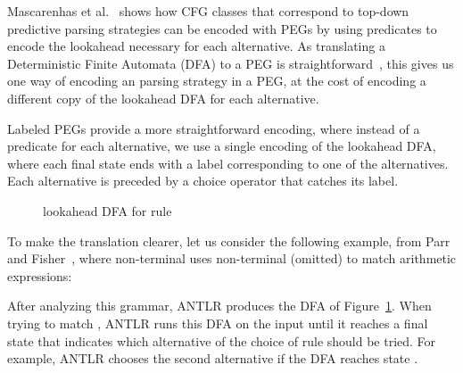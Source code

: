 \documentclass[3p,12pt,singlecolumn]{elsarticle}
\begin{document}
Mascarenhas et al.~\cite{mascarenhas2014} shows how
CFG classes that correspond to top-down predictive parsing
strategies can be encoded with PEGs by using predicates to
encode the lookahead necessary for each alternative.
As translating a Deterministic Finite Automata (DFA) to a
PEG is straightforward~\cite{ierusalimschy2009lpeg,mascarenhas2014},
this gives us one way of encoding an  parsing strategy in
a PEG, at the cost of encoding a different copy of the
lookahead DFA for each alternative.

Labeled PEGs provide a more straightforward encoding,
where instead of a predicate for each alternative, 
we use a single encoding of the lookahead DFA, where each
final state ends with a label corresponding to one
of the alternatives. Each alternative is preceded by
a choice operator that catches its label.

\begin{figure}[t]
\begin{center}
\end{center}
\caption{ lookahead DFA for rule }
\label{fig:antlrdfa}
\end{figure}

To make the translation clearer, let us consider the following
example, from Parr and Fisher~\cite{parr2011llstar},
where non-terminal  uses non-terminal  (omitted) to match
arithmetic expressions:


After analyzing this grammar, ANTLR produces the DFA
of Figure~\ref{fig:antlrdfa}. When trying to match ,
ANTLR runs this DFA on the input until it reaches a
final state that indicates which alternative of the
choice of rule  should be tried. For example,
ANTLR chooses the second alternative if the DFA
reaches state .
\end{document}
